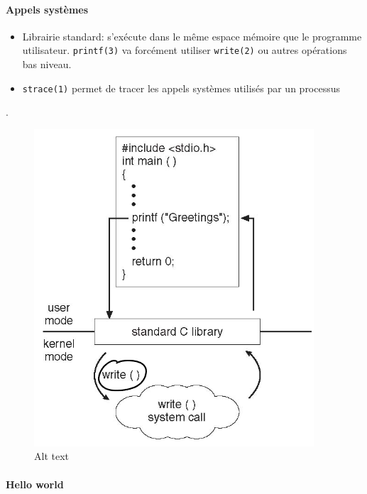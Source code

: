 \paragraph{Appels systèmes}\label{appels-systuxe8mes}

\begin{itemize}
\tightlist
\item
  Librairie standard: s'exécute dans le même espace mémoire que le
  programme utilisateur. \texttt{printf(3)} va forcément utiliser
  \texttt{write(2)} ou autres opérations bas niveau.
\item
  \texttt{strace(1)} permet de tracer les appels systèmes utilisés par
  un processus
\end{itemize}

.

\begin{figure}
\centering
\includegraphics{image-14.png}
\caption{Alt text}
\end{figure}

\paragraph{Hello world}\label{hello-world}

\begin{Shaded}
\begin{Highlighting}[]

\OperatorTok{(}\OperatorTok{,}  \OperatorTok{*}\OperatorTok{[])\{}
\OperatorTok{(}\OperatorTok{,}\OperatorTok{(}\OperatorTok{));}
   \OperatorTok{;}
\OperatorTok{\}}
\end{Highlighting}
\end{Shaded}

